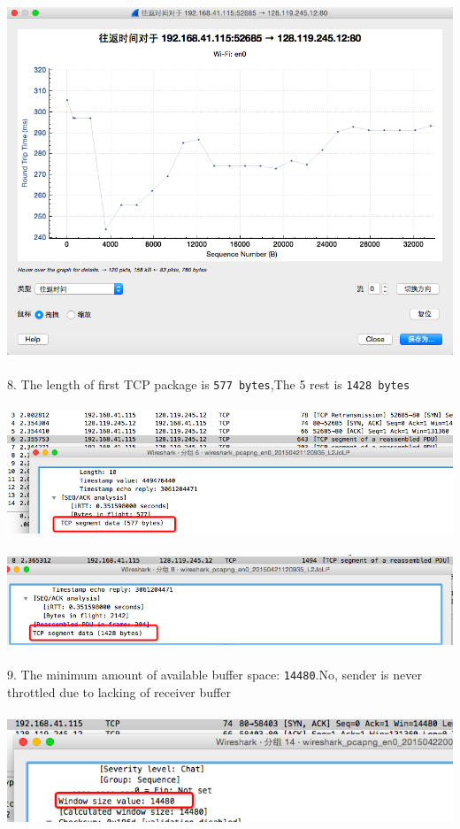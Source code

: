 \documentclass[a4paper]{article}
\begin{document}
{	{\centering\includegraphics[scale=0.5]{Illustrations/7_2.png}}\\\\
	8. The length of first TCP package is \verb|577 bytes|,The 5 rest is \verb|1428 bytes|\\\\
	{\centering\includegraphics[scale=0.5]{Illustrations/8_1.png}}\\\\
	{\centering\includegraphics[scale=0.5]{Illustrations/8_2.png}}\\\\
	9. The minimum amount of available buffer space: \verb|14480|.No, sender is never throttled due to lacking of receiver buffer\\\\
	{\centering\includegraphics[scale=0.5]{Illustrations/9.png}}\\\\
}
\end{document}
